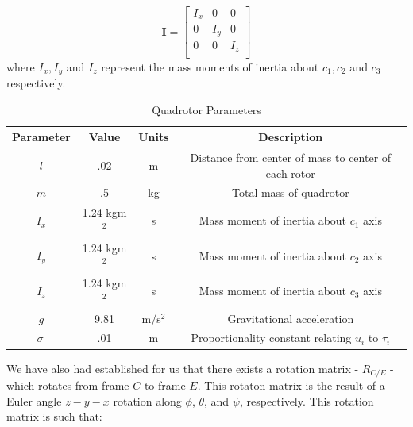 \documentclass{article}
\begin{document}
\begin{equation}
    \boldsymbol{I} = \begin{bmatrix}
        I_x & 0 & 0 \\
        0 & I_y & 0 \\
        0 & 0 & I_z \\
    \end{bmatrix}
\end{equation}
where $I_x, I_y $ and $I_z$ represent the mass moments of inertia about $c_1, c_2 $ and $c_3$ respectively.  

\begin{table}[]
\begin{centering}
\begin{tabular}{|cccc|}
\hline
Parameter & Value & Units  & Description  \\
\hline
 $l$  &  .02& m & Distance from center of mass to center of each rotor  \\
 $m$& .5 & kg &Total mass of quadrotor   \\
 $I_{x}$ & 1.24 kgm$^2 $ & s  & Mass moment of inertia about $c_1$ axis \\
 $I_{y}$ & 1.24 kgm$^2 $ & s  & Mass moment of inertia about $c_2$ axis \\
 $I_{z}$ & 1.24 kgm$^2 $ & s  & Mass moment of inertia about $c_3$ axis \\
$ g$ &9.81 & m/s$^2$ & Gravitational acceleration\\
$\sigma\ $& .01 & m & Proportionality constant relating $u_i $ to $\tau_i$\\
\hline
\end{tabular}
\caption{Quadrotor Parameters}
\label{tab:Qparams}
\end{centering}
\end{table}

We have also had established for us that there exists a rotation matrix - $R_{C/E}$ - which rotates from frame $C$ to frame $E$. This rotaton matrix is the result of a Euler angle $z-y-x$ rotation along $\phi$,  $\theta$, and $\psi$, respectively. This rotation matrix is such that:
\end{document}

